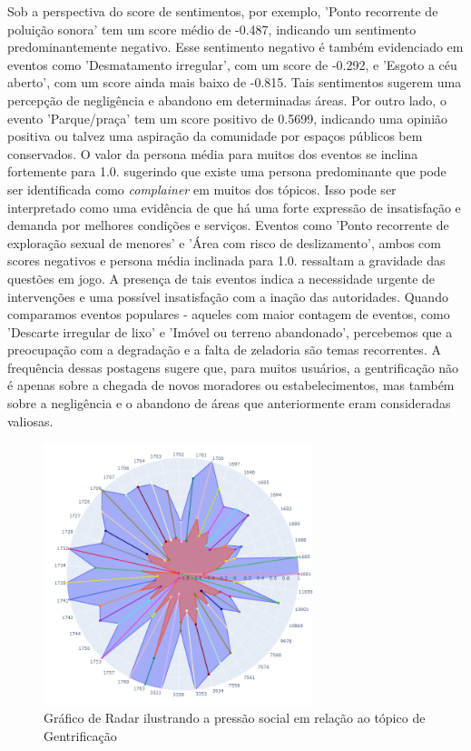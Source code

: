 Sob a perspectiva do score de sentimentos, por exemplo, 'Ponto recorrente de poluição sonora' tem um score médio de -0.487, indicando um sentimento predominantemente negativo. Esse sentimento negativo é também evidenciado em eventos como 'Desmatamento irregular', com um score de -0.292, e 'Esgoto a céu aberto', com um score ainda mais baixo de -0.815. Tais sentimentos sugerem uma percepção de negligência e abandono em determinadas áreas. Por outro lado, o evento 'Parque/praça' tem um score positivo de 0.5699, indicando uma opinião positiva ou talvez uma aspiração da comunidade por espaços públicos bem conservados. O valor da persona média para muitos dos eventos se inclina fortemente para 1.0. sugerindo que existe uma persona predominante que pode ser identificada como \textit{complainer} em muitos dos tópicos. Isso pode ser interpretado como uma evidência de que há uma forte expressão de insatisfação e demanda por melhores condições e serviços. Eventos como 'Ponto recorrente de exploração sexual de menores' e 'Área com risco de deslizamento', ambos com scores negativos e persona média inclinada para 1.0. ressaltam a gravidade das questões em jogo. A presença de tais eventos indica a necessidade urgente de intervenções e uma possível insatisfação com a inação das autoridades. Quando comparamos eventos populares - aqueles com maior contagem de eventos, como 'Descarte irregular de lixo' e 'Imóvel ou terreno abandonado', percebemos que a preocupação com a degradação e a falta de zeladoria são temas recorrentes. A frequência dessas postagens sugere que, para muitos usuários, a gentrificação não é apenas sobre a chegada de novos moradores ou estabelecimentos, mas também sobre a negligência e o abandono de áreas que anteriormente eram consideradas valiosas.

\begin{figure}[htb]
	\centering
	\includegraphics[width=0.7\textwidth]{images/social_barometer_gentrification.png}
	\caption{Gráfico de Radar ilustrando a pressão social em relação ao tópico de Gentrificação}
	\label{fig:social_barometer_gentrification}
\end{figure}

